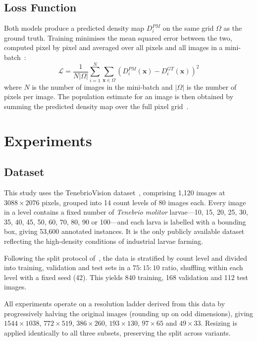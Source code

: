 \documentclass[conference]{IEEEtran}
\begin{document}
\subsection{Loss Function}

Both models produce a predicted density map $D_i^{PM}$ on the same grid $\Omega$ as the ground truth. Training minimises the mean squared error between the two, computed pixel by pixel and averaged over all pixels and all images in a mini-batch~\cite{li2018csrnet, wang2020mobilecount}:
\begin{equation}
  \label{eq:mse-loss}
  \mathcal{L} = \frac{1}{N \lvert \Omega \rvert} \sum_{i=1}^{N} \sum_{\mathbf{x} \in \Omega}
  \left( D_i^{PM}(\mathbf{x}) - D_i^{GT}(\mathbf{x}) \right)^2
\end{equation}
where $N$ is the number of images in the mini-batch and $\lvert \Omega \rvert$ is the number of pixels per image. The population estimate for an image is then obtained by summing the predicted density map over the full pixel grid~\cite{lempitsky2010learning}.

\section{Experiments}
\subsection{Dataset}
This study uses the TenebrioVision dataset~\cite{Papadopoulos2024TenebrioVision},
comprising 1{,}120 images at $3088 \times 2076$ pixels, grouped into 14 count
levels of 80 images each. Every image in a level contains a fixed number of
\textit{Tenebrio molitor} larvae---10, 15, 20, 25, 30, 35, 40, 45, 50, 60, 70,
80, 90 or 100---and each larva is labelled with a bounding box, giving 53{,}600
annotated instances. It is the only publicly available dataset reflecting the
high-density conditions of industrial larvae farming.

Following the split protocol of~\cite{Papadopoulos2024TenebrioVision}, the data
is stratified by count level and divided into training, validation and test sets
in a $75:15:10$ ratio, shuffling within each level with a fixed seed (42). This
yields 840 training, 168 validation and 112 test images.

All experiments operate on a resolution ladder derived from this data by
progressively halving the original images (rounding up on odd dimensions),
giving $1544\times1038$, $772\times519$, $386\times260$, $193\times130$,
$97\times65$ and $49\times33$. Resizing is applied identically to all three
subsets, preserving the split across variants.
\end{document}
